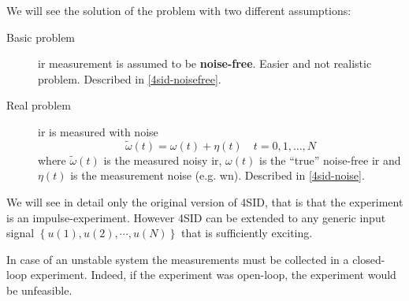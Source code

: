 We will see the solution of the problem with two different assumptions:
\begin{description}
    \item [Basic problem] \gls{ir} measurement is assumed to be \textbf{noise-free}. Easier and not realistic problem. Described in \ref{4sid-noisefree}.
    \item [Real problem] \gls{ir} is measured with noise
    \[ \widetilde{\omega}(t) = \omega(t) + \eta(t) \quad t = 0, 1,\dots, N \] where
        $\widetilde{\omega}(t)$ is the measured noisy \gls{ir},
        $\omega(t)$ is the ``true'' noise-free \gls{ir} and
        $\eta(t)$ is the measurement noise (e.g. \gls{wn}). Described in \ref{4sid-noise}.
\end{description}

\begin{remark}
    We will see in detail only the original version of 4SID, that is that the experiment is an impulse-experiment.
    However 4SID can be extended to any generic input signal $\left\{ u(1), u(2), \cdots, u(N) \right\}$ that is sufficiently exciting.
\end{remark}

\begin{remark}
    In case of an unstable system the measurements must be collected in a closed-loop experiment.
    Indeed, if the experiment was open-loop, the experiment would be unfeasible.

    \begin{figure}[H]
        \centering
    \end{figure}
\end{remark}

